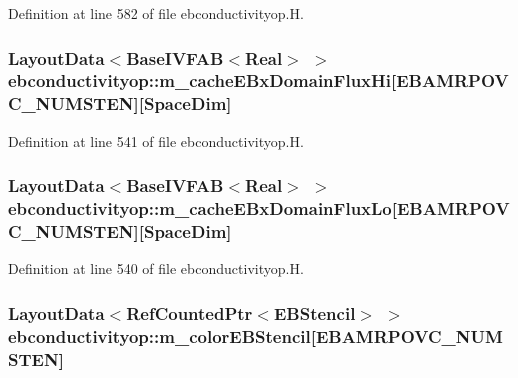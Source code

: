 Definition at line 582 of file ebconductivityop.\+H.

\subsubsection[{\texorpdfstring{m\+\_\+cache\+E\+Bx\+Domain\+Flux\+Hi}{m_cacheEBxDomainFluxHi}}]{\setlength{\rightskip}{0pt plus 5cm}Layout\+Data$<$Base\+I\+V\+F\+AB$<$Real$>$ $>$ ebconductivityop\+::m\+\_\+cache\+E\+Bx\+Domain\+Flux\+Hi\mbox{[}E\+B\+A\+M\+R\+P\+O\+V\+C\+\_\+\+N\+U\+M\+S\+T\+EN\mbox{]}\mbox{[}Space\+Dim\mbox{]}\hspace{0.3cm}{\ttfamily [protected]}}\hypertarget{classebconductivityop_a73be153aeeef1b6a801583a76c49a67e}{}\label{classebconductivityop_a73be153aeeef1b6a801583a76c49a67e}


Definition at line 541 of file ebconductivityop.\+H.

\subsubsection[{\texorpdfstring{m\+\_\+cache\+E\+Bx\+Domain\+Flux\+Lo}{m_cacheEBxDomainFluxLo}}]{\setlength{\rightskip}{0pt plus 5cm}Layout\+Data$<$Base\+I\+V\+F\+AB$<$Real$>$ $>$ ebconductivityop\+::m\+\_\+cache\+E\+Bx\+Domain\+Flux\+Lo\mbox{[}E\+B\+A\+M\+R\+P\+O\+V\+C\+\_\+\+N\+U\+M\+S\+T\+EN\mbox{]}\mbox{[}Space\+Dim\mbox{]}\hspace{0.3cm}{\ttfamily [protected]}}\hypertarget{classebconductivityop_ac7372f4b80e621f026d401a98aa70917}{}\label{classebconductivityop_ac7372f4b80e621f026d401a98aa70917}


Definition at line 540 of file ebconductivityop.\+H.

\subsubsection[{\texorpdfstring{m\+\_\+color\+E\+B\+Stencil}{m_colorEBStencil}}]{\setlength{\rightskip}{0pt plus 5cm}Layout\+Data$<$Ref\+Counted\+Ptr$<$E\+B\+Stencil$>$ $>$ ebconductivityop\+::m\+\_\+color\+E\+B\+Stencil\mbox{[}E\+B\+A\+M\+R\+P\+O\+V\+C\+\_\+\+N\+U\+M\+S\+T\+EN\mbox{]}\hspace{0.3cm}{\ttfamily [protected]}}\hypertarget{classebconductivityop_aad7ee3814b90ffeee32595b874b9f042}{}\label{classebconductivityop_aad7ee3814b90ffeee32595b874b9f042}


